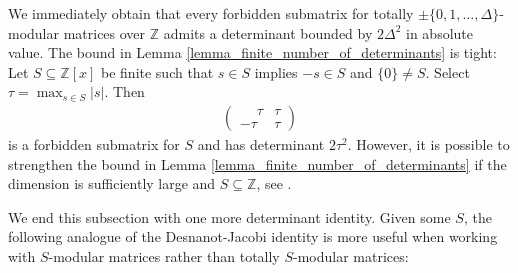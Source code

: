 \documentclass[a4paper, 11pt]{article}
\newcommand{\Z}{\mathbb{Z}}
\newcommand{\indet}{x}
\newcommand{\polyring}{\Z[\indet]}
\newcommand{\polyS}{S}
\begin{document}
	We immediately obtain that every forbidden submatrix for totally $\pm\lbrace 0, 1,\ldots,\Delta\rbrace$-modular matrices over $\Z$ admits a determinant bounded by $2\Delta^2$ in absolute value. The bound in Lemma \ref{lemma_finite_number_of_determinants} is tight: Let $\polyS\subseteq\polyring$ be finite such that $s\in \polyS$ implies $-s\in \polyS$ and $\lbrace 0\rbrace \neq \polyS$. Select $\tau = \max_{s\in S}\left|s\right|$. Then
	\begin{align*}
		\begin{pmatrix} \phantom{-}\tau & \tau \\ -\tau & \tau\end{pmatrix}
	\end{align*}
	is a forbidden submatrix for $S$ and has determinant $2\tau^2$. However, it is possible to strengthen the bound in Lemma \ref{lemma_finite_number_of_determinants} if the dimension is sufficiently large and $S\subseteq \Z$, see \cite[Theorem 4]{celayakuhlmannweismantel2024matricespolynomial}.

We end this subsection with one more determinant identity. Given some $\polyS$, the following analogue of the Desnanot-Jacobi identity is more useful when working with $\polyS$-modular matrices rather than totally $\polyS$-modular matrices:
\end{document}
